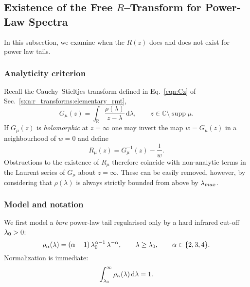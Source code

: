 \subsection{Existence of the Free $R$–Transform for Power-Law Spectra}
\label{sxn:RTransformExists}

In this subsection, we examine when the \RTransform $R(z)$ does and does not exist
for power law tails.

\subsubsection{Analyticity criterion}
\label{sxn:RTransformExists:criterion}

Recall the Cauchy–Stieltjes transform defined in Eq.~\eqref{eqn:Cz} of
Sec.~\ref{sxn:r_transforms:elementary_rmt},
\begin{equation}
\label{eqn:RTransformExists_Gdef}
G_\mu(z)=\int_{\mathbb R}\frac{\rho(\lambda)}{z-\lambda}\,
         \mathrm d\lambda,
\qquad
z\in\mathbb C\setminus\operatorname{supp}\mu .
\end{equation}
If $G_\mu(z)$ is \emph{holomorphic} at $z=\infty$ one may invert the map
$w=G_\mu(z)$ in a neighbourhood of $w=0$ and define
\begin{equation}
\label{eqn:RTransformExists_Rdef}
R_\mu(z)=G_\mu^{-1}(z)-\frac{1}{w}.
\end{equation}
Obstructions to the existence of $R_\mu$ therefore coincide with
non-analytic terms in the Laurent series of $G_\mu$ about $z=\infty$.
These can be easily removed, however, by considering that $\rho(\lambda)$ is always strictly bounded from above by $\lambda_{max}$. 
\subsubsection{Model and notation}
\label{sxn:RTransformExists:model}

We first model a \emph{bare} power-law tail regularised only by a hard
infrared cut-off $\lambda_{0}>0$:
\begin{equation}
\label{eqn:RTransformExists_density_bare}
\rho_{\alpha}(\lambda)=
(\alpha-1)\,\lambda_{0}^{\alpha-1}\,
\lambda^{-\alpha},
\qquad
\lambda\ge\lambda_{0},
\qquad
\alpha\in\{2,3,4\}.
\end{equation}
Normalization is immediate:
\begin{equation}
\label{eqn:RTransformExists_norm}
\int_{\lambda_{0}}^{\infty}\rho_{\alpha}(\lambda)\,
      \mathrm d\lambda = 1.
\end{equation}


